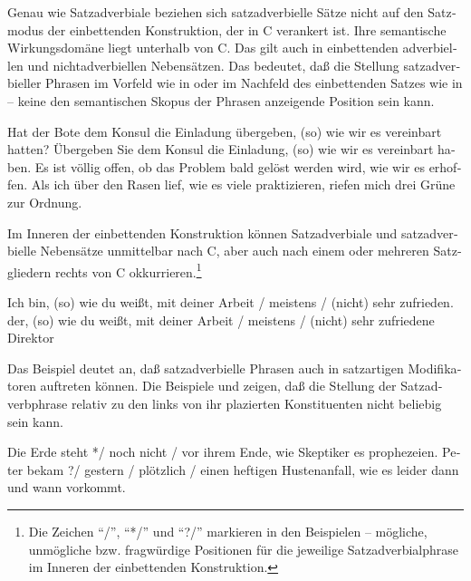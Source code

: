 \documentclass[output=paper, colorlinks, citecolor=brown, booklanguage=german]{langscibook}
\begin{document}
\begin{otherlanguage}{german}
\z

\noindent Genau wie Satzadverbiale beziehen sich satzadverbielle Sätze nicht auf den Satzmodus der einbettenden Konstruktion, der in C verankert ist. Ihre semantische Wirkungsdomäne liegt unterhalb von C. Das gilt auch in einbettenden adverbiellen und nichtadverbiellen Nebensätzen. Das bedeutet, daß die Stellung satzadverbieller Phrasen im Vorfeld wie in  oder im Nachfeld des einbettenden Satzes wie in -- keine den semantischen Skopus der Phrasen anzeigende Position sein kann.

\ea Hat der Bote dem Konsul die Einladung übergeben, (so) wie wir es vereinbart hatten? \label{ex:zi97:19}
\ex Übergeben Sie dem Konsul die Einladung, (so) wie wir es vereinbart haben. \label{ex:zi97:20}
\ex Es ist völlig offen, ob das Problem bald gelöst werden wird, wie wir es erhoffen. \label{ex:zi97:21}
\ex Als ich über den Rasen lief, wie es viele praktizieren, riefen mich drei Grüne zur Ordnung. \label{ex:zi97:22}
\z

\noindent Im Inneren der einbettenden Konstruktion können Satzadverbiale und satzadverbielle Nebensätze unmittelbar nach C, aber auch nach einem oder mehreren Satzgliedern rechts von C okkurrieren.\footnote{Die Zeichen ``/'', ``*/'' und ``?/'' markieren in den Beispielen -- mögliche, unmögliche bzw. fragwürdige Positionen für die jeweilige Satzadverbialphrase im Inneren der einbettenden Konstruktion.}

\ea Ich bin, (so) wie du weißt, mit deiner Arbeit / meistens / (nicht) sehr zufrieden. \label{ex:zi97:23}
\ex der, (so) wie du weißt, mit deiner Arbeit / meistens / (nicht) sehr zufriedene Direktor \label{ex:zi97:24}
\z

\noindent Das Beispiel  deutet an, daß satzadverbielle Phrasen auch in satzartigen Modifikatoren auftreten können. Die Beispiele  und  zeigen, daß die Stellung der Satzadverbphrase relativ zu den links von ihr plazierten Konstituenten nicht beliebig sein kann.

\ea Die Erde steht */ noch nicht / vor ihrem Ende, wie Skeptiker es prophezeien. \label{ex:zi97:25}
\ex Peter bekam ?/ gestern / plötzlich / einen heftigen Hustenanfall, wie es leider dann und wann vorkommt. \label{ex:zi97:26}
\z


\end{otherlanguage}
\end{document}
